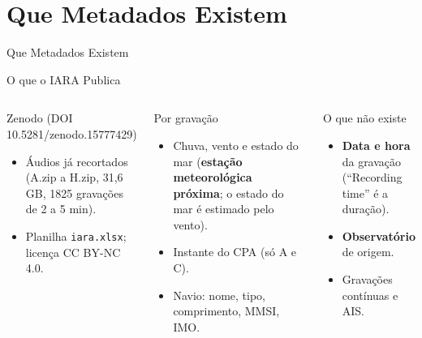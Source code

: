 \documentclass[aspectratio=169]{beamer}
\begin{document}
\section{Que Metadados Existem}

\begin{frame}
    \centering
    \huge Que Metadados Existem
\end{frame}

\begin{frame}{O que o IARA Publica}
    \footnotesize
    \begin{columns}[t]
        \begin{block}{\small Zenodo (DOI 10.5281/zenodo.15777429)}
            \scriptsize
            \begin{itemize}
                \setlength{\itemsep}{1pt}
                \item Áudios já recortados (A.zip a H.zip, 31,6 GB, 1825 gravações de 2 a 5 min).
                \item Planilha \texttt{iara.xlsx}; licença CC BY-NC 4.0.
            \end{itemize}
        \end{block}
        \begin{block}{\small Por gravação}
            \scriptsize
            \begin{itemize}
                \setlength{\itemsep}{1pt}
                \item Chuva, vento e estado do mar (\textbf{estação meteorológica próxima}; o estado do mar é estimado pelo vento).
                \item Instante do CPA (só A e C).
                \item Navio: nome, tipo, comprimento, MMSI, IMO.
            \end{itemize}
        \end{block}
        \begin{alertblock}{\small O que não existe}
            \scriptsize
            \begin{itemize}
                \setlength{\itemsep}{1pt}
                \item \textbf{Data e hora} da gravação (``Recording time'' é a duração).
                \item \textbf{Observatório} de origem.
                \item Gravações contínuas e AIS.
            \end{itemize}

\end{alertblock}
\end{columns}
\end{frame}
\end{document}
